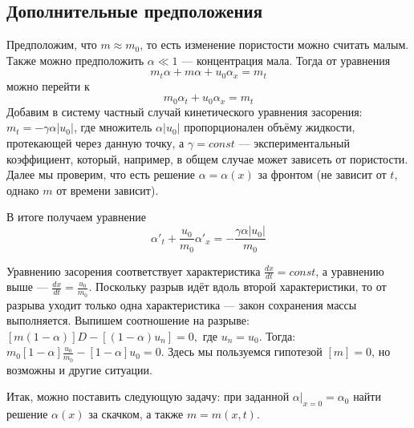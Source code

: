 \documentclass[a4paper,12pt]{article}
\renewcommand{\d}{\displaystyle}
\begin{document}
\subsection{Дополнительные предположения}
\par Предположим, что $m\approx m_{0}$, то есть изменение пористости можно считать малым. Также можно предположить $\alpha\ll 1$ --- концентрация мала. Тогда от уравнения $$m_{t}\alpha + m\alpha+u_{0}\alpha_{x}=m_{t}$$ можно перейти к $$m_{0}\alpha_{t}+u_{0}\alpha_{x}=m_{t}$$ Добавим в систему частный случай кинетического уравнения засорения: $m_{t}=-\gamma \alpha |u_{0}|$, где множитель $\alpha |u_{0}|$ пропорционален объёму жидкости, протекающей через данную точку, а $\gamma=const$ --- экспериментальный коэффициент, который, например, в общем случае может зависеть от пористости. Далее мы проверим, что есть решение $\alpha=\alpha(x)$ за фронтом (не зависит от $t$, однако $m$ от времени зависит).\\
\par В итоге получаем уравнение $$\alpha'_{t}+\frac{u_{0}}{m_{0}}\alpha'_{x}=-\frac{\gamma\alpha |u_{0}|}{m_{0}}$$ 
\par Уравнению засорения соответствует характеристика $\d \frac{dx}{dt}=const$, а уравнению выше --- $\d\frac{dx}{dt}=\frac{u_{0}}{m_{0}}$. Поскольку разрыв идёт вдоль второй характеристики, то от разрыва уходит только одна характеристика --- закон сохранения массы выполняется. Выпишем соотношение на разрыве: $[m(1-\alpha)]D-[(1-\alpha)u_{n}]=0,$ где $u_{n}=u_{0}$. Тогда: $m_{0}[1-\alpha]\frac{u_{0}}{m_{0}}-[1-\alpha]u_{0}=0$. Здесь мы пользуемся гипотезой $[m]=0$, но возможны и другие ситуации. \\
\par Итак, можно поставить следующую задачу: при заданной $\alpha|_{x=0}=\alpha_{0}$ найти решение $\alpha(x)$ за скачком, а также $m=m(x,t)$. 
\end{document}
